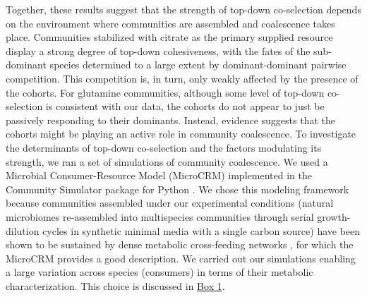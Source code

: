 \documentclass[a4paper,10pt]{article}
\begin{document}
Together, these results suggest that the strength of top-down co-selection depends on
the environment where communities are assembled and coalescence takes place.
Communities stabilized with citrate as the primary supplied resource
display a strong degree of top-down cohesiveness,
with the fates of the sub-dominant species determined to a large extent by dominant-dominant
pairwise competition. This competition is, in turn, only weakly affected by the presence of the cohorts.
For glutamine communities, although some level of top-down co-selection is consistent with our data,
the cohorts do not appear to just be passively responding to their dominants.
Instead, evidence suggests that the cohorts might be playing an active role in community coalescence.
To investigate the determinants of top-down co-selection and the factors modulating its strength,
we ran a set of simulations of community coalescence. We used a Microbial Consumer-Resource
Model (MicroCRM) \cite{Goldford2018,Marsland2019} implemented in the Community Simulator package
for Python \cite{Marsland2020}. We chose this modeling framework because
communities assembled under our experimental conditions (natural microbiomes re-assembled into
multispecies communities through serial growth-dilution cycles in synthetic minimal media
with a single carbon source)
have been shown to be sustained by dense metabolic cross-feeding networks
\cite{Goldford2018,Estrela2020},
for which the MicroCRM provides a good description.
We carried out our simulations enabling a large variation across species (consumers) in terms of
their metabolic characterization.
This choice is discussed in \hyperref[box1]{Box 1}.

\clearpage
\end{document}
